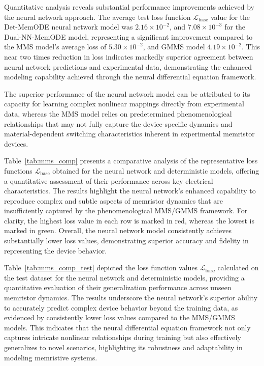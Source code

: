 \documentclass[lettersize,journal]{IEEEtran}
\begin{document}
Quantitative analysis reveals substantial performance improvements achieved by the neural network approach. The average test loss function $\mathcal{L}_{\mathrm{base}}$ value for the Det-MemODE neural network model was \(2.16 \times 10^{-2}\), and \(7.08 \times 10^{-3}\) for the Dual-NN-MemODE model, representing a significant improvement compared to the MMS model's average loss of \(5.30 \times 10^{-2}\), and GMMS model \(4.19 \times 10^{-2}\). This near two times reduction in loss indicates markedly superior agreement between neural network predictions and experimental data, demonstrating the enhanced modeling capability achieved through the neural differential equation framework.


The superior performance of the neural network model can be attributed to its capacity for learning complex nonlinear mappings directly from experimental data, whereas the MMS model relies on predetermined phenomenological relationships that may not fully capture the device-specific dynamics and material-dependent switching characteristics inherent in experimental memristor devices.
\newcommand{\redbar}{\protect\tikz[baseline=-0.1ex]\fill[ieeered] (0,0) rectangle (0.8em,1.2ex);}\newcommand{\bluebar}{\protect\tikz[baseline=-0.1ex]\fill[ieeeblue] (0,0) rectangle (0.8em,1.2ex);}
\newcommand{\greenbar}{\protect\tikz[baseline=-0.1ex]\fill[ieeegreen] (0,0) rectangle (0.8em,1.2ex);}



Table~\ref{tab:mms_comp} presents a comparative analysis of the representative loss functions $\mathcal{L}_{\mathrm{base}}$ obtained for the neural network and deterministic models, offering a quantitative assessment of their performance across key electrical characteristics. The results highlight the neural network’s enhanced capability to reproduce complex and subtle aspects of memristor dynamics that are insufficiently captured by the phenomenological MMS/GMMS framework. For clarity, the highest loss value in each row is marked in red, whereas the lowest is marked in green. Overall, the neural network model consistently achieves substantially lower loss values, demonstrating superior accuracy and fidelity in representing the device behavior.

Table~\ref{tab:mms_comp_test} depicted the loss function values $\mathcal{L}_{\mathrm{base}}$ calculated on the test dataset for the neural network and deterministic models, providing a quantitative evaluation of their generalization performance across unseen memristor dynamics. The results underscore the neural network's superior ability to accurately predict complex device behavior beyond the training data, as evidenced by consistently lower loss values compared to the MMS/GMMS models. This indicates that the neural differential equation framework not only captures intricate nonlinear relationships during training but also effectively generalizes to novel scenarios, highlighting its robustness and adaptability in modeling memristive systems.
\end{document}
